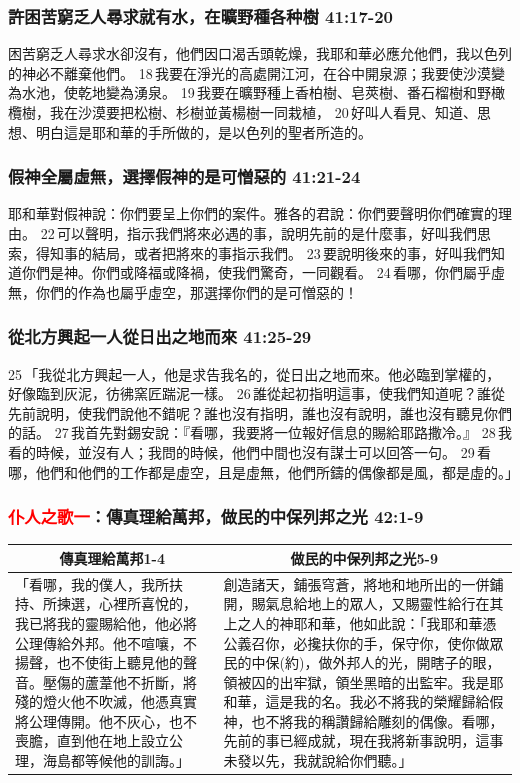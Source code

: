 \subsubsection{許困苦窮乏人尋求就有水，在曠野種各种樹 41:17-20}
困苦窮乏人尋求水卻沒有，他們因口渴舌頭乾燥，我耶和華必應允他們，我以色列的神必不離棄他們。 18 我要在淨光的高處開江河，在谷中開泉源；我要使沙漠變為水池，使乾地變為湧泉。 19 我要在曠野種上香柏樹、皂莢樹、番石榴樹和野橄欖樹，我在沙漠要把松樹、杉樹並黃楊樹一同栽植， 20 好叫人看見、知道、思想、明白這是耶和華的手所做的，是以色列的聖者所造的。
\fi

\subsubsection{假神全屬虛無，選擇假神的是可憎惡的 41:21-24}
耶和華對假神說：你們要呈上你們的案件。雅各的君說：你們要聲明你們確實的理由。 22 可以聲明，指示我們將來必遇的事，說明先前的是什麼事，好叫我們思索，得知事的結局，或者把將來的事指示我們。 23 要說明後來的事，好叫我們知道你們是神。你們或降福或降禍，使我們驚奇，一同觀看。 24 看哪，你們屬乎虛無，你們的作為也屬乎虛空，那選擇你們的是可憎惡的！

\subsubsection{從北方興起一人從日出之地而來 41:25-29}
25 「我從北方興起一人，他是求告我名的，從日出之地而來。他必臨到掌權的，好像臨到灰泥，彷彿窯匠踹泥一樣。 26 誰從起初指明這事，使我們知道呢？誰從先前說明，使我們說他不錯呢？誰也沒有指明，誰也沒有說明，誰也沒有聽見你們的話。 27 我首先對錫安說：『看哪，我要將一位報好信息的賜給耶路撒冷。』 28 我看的時候，並沒有人；我問的時候，他們中間也沒有謀士可以回答一句。 29 看哪，他們和他們的工作都是虛空，且是虛無，他們所鑄的偶像都是風，都是虛的。」


\subsubsection{\textcolor{red}{仆人之歌一}：傳真理給萬邦，做民的中保列邦之光 42:1-9}
\begin{table}[H]
\centering
\begin{tabular}{p{6.75cm}|p{10.0cm}}\hline\hline
\multicolumn{1}{c|}{傳真理給萬邦1-4}&\multicolumn{1}{c}{做民的中保列邦之光5-9}\\\hline
「看哪，我的僕人，我所扶持、所揀選，心裡所喜悅的，我已將我的靈賜給他，他必將公理傳給外邦。他不喧嚷，不揚聲，也不使街上聽見他的聲音。壓傷的蘆葦他不折斷，將殘的燈火他不吹滅，他憑真實將公理傳開。他不灰心，也不喪膽，直到他在地上設立公理，海島都等候他的訓誨。」
&創造諸天，鋪張穹蒼，將地和地所出的一併鋪開，賜氣息給地上的眾人，又賜靈性給行在其上之人的神耶和華，他如此說：「我耶和華憑公義召你，必攙扶你的手，保守你，使你做眾民的中保(約)，做外邦人的光，開瞎子的眼，領被囚的出牢獄，領坐黑暗的出監牢。我是耶和華，這是我的名。我必不將我的榮耀歸給假神，也不將我的稱讚歸給雕刻的偶像。看哪，先前的事已經成就，現在我將新事說明，這事未發以先，我就說給你們聽。」\\\hline
\end{tabular}
\end{table}



